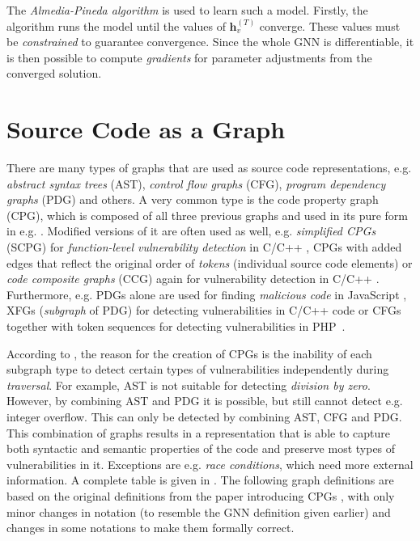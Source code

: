 The \textit{Almedia-Pineda algorithm} is used to learn such a model. Firstly, the algorithm runs the model until the values of $\textbf{h}_\mathit{v}^{(\mathit{T})}$ converge. These values must be \textit{constrained} to guarantee convergence. Since the whole GNN is differentiable, it is then possible to compute \textit{gradients} for parameter adjustments from the converged solution.

\section{Source Code as a Graph}
\label{cpg}

There are many types of graphs that are used as source code representations, e.g. \textit{abstract syntax trees} (AST), \textit{control flow graphs} (CFG), \textit{program dependency graphs} (PDG) and others. A very common type is the code property graph (CPG), which is composed of all three previous graphs and used in its pure form in e.g. \cite{USE-CPG-liu2020retrieval, GNN4-IBM-suneja2020learning}. Modified versions of it are often used as well, e.g. \textit{simplified CPGs} (SCPG) for \textit{function-level vulnerability detection} in C/C++ \cite{SCPG-wu2021vulnerability}, CPGs with added edges that reflect the original order of \textit{tokens} (individual source code elements) \cite{GNN2-zhou2019devign} or \textit{code composite graphs} (CCG) again for vulnerability detection in C/C++ \cite{GNN1-cao2021bgnn4vd}. Furthermore, e.g. PDGs alone are used for finding \textit{malicious code} in JavaScript \cite{GNN8-RNN-fang2022jstrong}, XFGs (\textit{subgraph} of PDG) for detecting vulnerabilities in C/C++ code \cite{GNN3-cheng2021deepwukong} or CFGs together with token sequences for detecting vulnerabilities in PHP~\cite{PHP-rabheru2020hybrid}.

According to \cite{CPG-yamaguchi2014modeling}, the reason for the creation of CPGs is the inability of each subgraph type to detect certain types of vulnerabilities independently during \textit{traversal}. For example, AST is not suitable for detecting \textit{division by zero}. However, by combining AST and PDG it is possible, but still cannot detect e.g. integer overflow. This can only be detected by combining AST, CFG and PDG. This combination of graphs results in a representation that is able to capture both syntactic and semantic properties of the code and preserve most types of vulnerabilities in it. Exceptions are e.g. \textit{race conditions}, which need more external information. A complete table is given in \cite{CPG-yamaguchi2014modeling}. The following graph definitions are based on the original definitions from the paper introducing CPGs \cite{CPG-yamaguchi2014modeling}, with only minor changes in notation (to resemble the GNN definition given earlier) and changes in some notations to make them formally correct.

